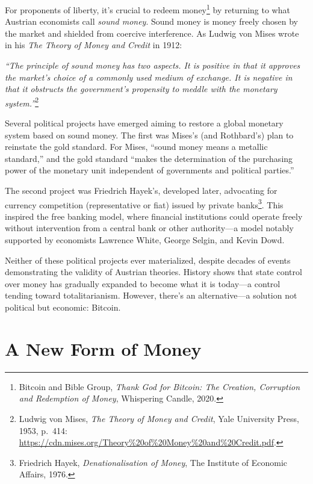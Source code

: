\documentclass[
  a5paper,
  smalldemyvopaper,10pt,twoside,onecolumn,openright,extrafontsizes,hidelinks]{memoir}
\begin{document}
For proponents of liberty, it's crucial to redeem money\footnote{Bitcoin
  and Bible Group, \emph{Thank God for Bitcoin: The Creation, Corruption
  and Redemption of Money}, Whispering Candle, 2020.} by returning to
what Austrian economists call \emph{sound money}. Sound money is money
freely chosen by the market and shielded from coercive interference. As
Ludwig von Mises wrote in his \emph{The Theory of Money and Credit} in
1912:

\emph{``The principle of sound money has two aspects. It is positive in
that it approves the market's choice of a commonly used medium of
exchange. It is negative in that it obstructs the government's
propensity to meddle with the monetary system.''}\footnote{Ludwig von
  Mises, \emph{The Theory of Money and Credit}, Yale University Press,
  1953, p.~414:
  \url{https://cdn.mises.org/Theory\%20of\%20Money\%20and\%20Credit.pdf}.}

Several political projects have emerged aiming to restore a global
monetary system based on sound money. The first was Mises's (and
Rothbard's) plan to reinstate the gold standard. For Mises, ``sound
money means a metallic standard,'' and the gold standard ``makes the
determination of the purchasing power of the monetary unit independent
of governments and political parties.''

The second project was Friedrich Hayek's, developed later, advocating
for currency competition (representative or fiat) issued by private
banks\footnote{Friedrich Hayek, \emph{Denationalisation of Money}, The
  Institute of Economic Affairs, 1976.}. This inspired the free banking
model, where financial institutions could operate freely without
intervention from a central bank or other authority---a model notably
supported by economists Lawrence White, George Selgin, and Kevin Dowd.

Neither of these political projects ever materialized, despite decades
of events demonstrating the validity of Austrian theories. History shows
that state control over money has gradually expanded to become what it
is today---a control tending toward totalitarianism. However, there's an
alternative---a solution not political but economic: Bitcoin.

\section*{A New Form of Money}\label{une-nouvelle-forme-de-monnaie}
\end{document}
